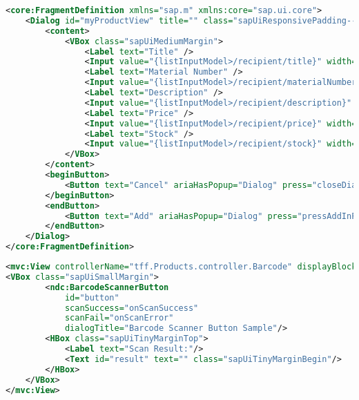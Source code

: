 \begin{mdframed}[backgroundcolor=mygrey2, leftmargin=0.5cm, hidealllines=true, innerleftmargin=3pt, innerrightmargin=0cm, innertopmargin=0cm, innerbottommargin=-3cm, splitbottomskip=0]
\begin{lstlisting}[language=XML,  caption={CreateProductDialog fragment der Anwendung in XML Format}]
<core:FragmentDefinition xmlns="sap.m" xmlns:core="sap.ui.core">
    <Dialog id="myProductView" title="" class="sapUiResponsivePadding--header sapUiResponsivePadding--footer" initialFocus="email">
        <content>
            <VBox class="sapUiMediumMargin">
                <Label text="Title" />
                <Input value="{listInputModel>/recipient/title}" width="200px" />
                <Label text="Material Number" />
                <Input value="{listInputModel>/recipient/materialNumber}" width="200px" />
                <Label text="Description" />
                <Input value="{listInputModel>/recipient/description}" width="200px" />
                <Label text="Price" />
                <Input value="{listInputModel>/recipient/price}" width="200px" />
                <Label text="Stock" />
                <Input value="{listInputModel>/recipient/stock}" width="200px" />
            </VBox>
        </content>
        <beginButton>
            <Button text="Cancel" ariaHasPopup="Dialog" press="closeDialog" />
        </beginButton>
        <endButton>
            <Button text="Add" ariaHasPopup="Dialog" press="pressAddInProductsList" />
        </endButton>
    </Dialog>
</core:FragmentDefinition>
\end{lstlisting}
\end{mdframed}

\begin{mdframed}[backgroundcolor=mygrey2, leftmargin=0.5cm, hidealllines=true, innerleftmargin=3pt, innerrightmargin=0cm, innertopmargin=0cm, innerbottommargin=-3cm, splitbottomskip=0]
\begin{lstlisting}[language=XML,  caption={Barcode View der Anwendung in XML Format}]
<mvc:View controllerName="tff.Products.controller.Barcode" displayBlock="true" xmlns:ndc="sap.ndc" xmlns="sap.m" xmlns:mvc="sap.ui.core.mvc">
<VBox class="sapUiSmallMargin">
		<ndc:BarcodeScannerButton
			id="button"
			scanSuccess="onScanSuccess"
			scanFail="onScanError"
			dialogTitle="Barcode Scanner Button Sample"/>
		<HBox class="sapUiTinyMarginTop">
			<Label text="Scan Result:"/>
			<Text id="result" text="" class="sapUiTinyMarginBegin"/>
		</HBox>
	</VBox>
</mvc:View>
\end{lstlisting}
\end{mdframed}

